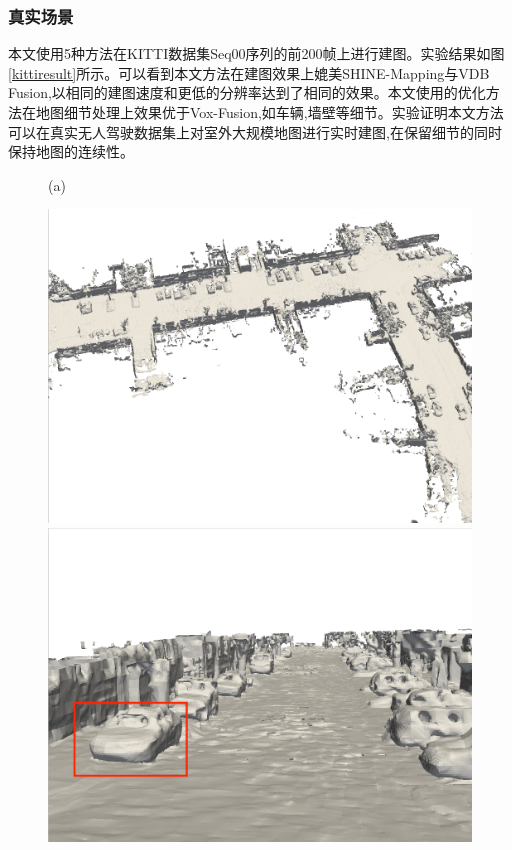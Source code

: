 \subsubsection{真实场景}
本文使用5种方法在KITTI数据集Seq00序列的前200帧上进行建图。实验结果如图\ref{kittiresult}所示。可以看到本文方法在建图效果上媲美SHINE-Mapping与VDB Fusion,以相同的建图速度和更低的分辨率达到了相同的效果。本文使用的优化方法在地图细节处理上效果优于Vox-Fusion,如车辆,墙壁等细节。实验证明本文方法可以在真实无人驾驶数据集上对室外大规模地图进行实时建图,在保留细节的同时保持地图的连续性。
\begin{figure}[htbp]
	\centering
    (a)
	\begin{minipage}{0.322\linewidth}
		\centering
		\includegraphics[width=1\linewidth]{figures/kitti_1_vox.png}
	\end{minipage}\hfill
	\begin{minipage}{0.322\linewidth}
		\centering
		\includegraphics[width=1\linewidth]{figures/kitti_2_vox.png}

\end{minipage}
\end{figure}
